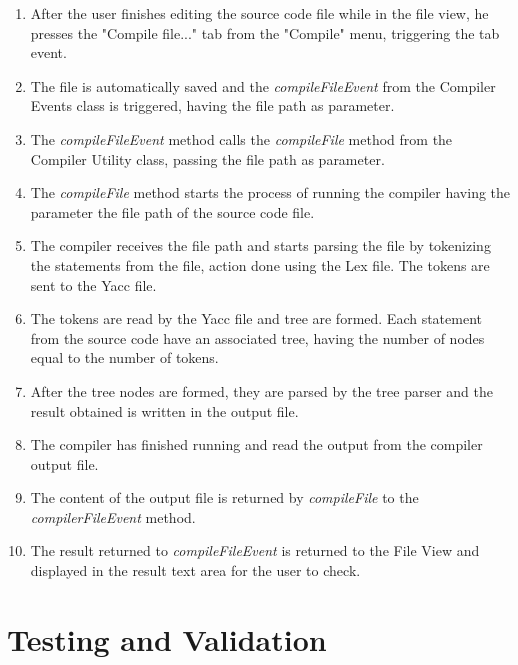 \documentclass[12pt,a4paper,twoside]{report}
\begin{document}
\begin{enumerate}
\item After the user finishes editing the source code file while in the file view, he presses the "Compile file..." tab from the "Compile" menu, triggering the tab event.

\item The file is automatically saved and the \textit{compileFileEvent} from the Compiler Events class is triggered, having the file path as parameter.

\item The \textit{compileFileEvent} method calls the \textit{compileFile} method from the Compiler Utility class, passing the file path as parameter.

\item The \textit{compileFile} method starts the process of running the compiler having the parameter the file path of the source code file.

\item The compiler receives the file path and starts parsing the file by tokenizing the statements from the file, action done using the Lex file. The tokens are sent to the Yacc file. 

\item The tokens are read by the Yacc file and tree are formed. Each statement from the source code have an associated tree, having the number of nodes equal to the number of tokens.

\item After the tree nodes are formed, they are parsed by the tree parser and the result obtained is written in the output file. 

\item The compiler has finished running and read the output from the compiler output file.

\item The content of the output file is returned by \textit{compileFile} to the \textit{compilerFileEvent} method.

\item The result returned to \textit{compileFileEvent} is returned to the File View and displayed in the result text area for the user to check.
\end{enumerate}


\chapter{Testing and Validation}
\end{document}
